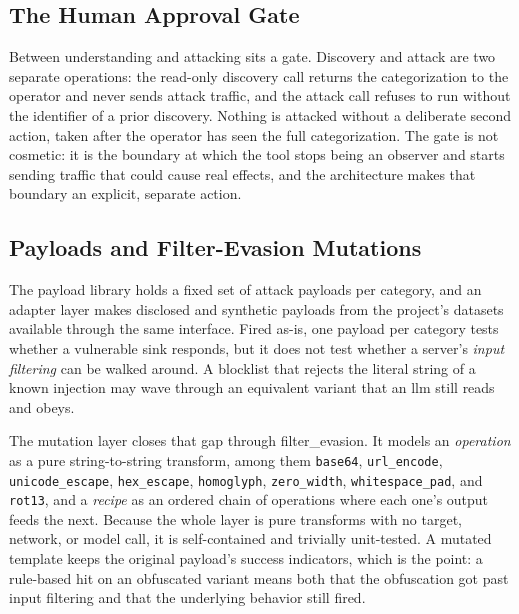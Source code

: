 \subsection{The Human Approval Gate}
\label{sec:gate}

Between understanding and attacking sits a  gate. Discovery and attack are two separate operations: the read-only discovery call returns the categorization to the operator and never sends attack traffic, and the attack call refuses to run without the identifier of a prior discovery. Nothing is attacked without a deliberate second action, taken after the operator has seen the full categorization. The gate is not cosmetic: it is the boundary at which the tool stops being an observer and starts sending traffic that could cause real effects, and the architecture makes that boundary an explicit, separate action.

\subsection{Payloads and Filter-Evasion Mutations}
\label{sec:payloads}

The payload library holds a fixed set of attack \glspl{payload} per category, and an adapter layer makes disclosed and synthetic payloads from the project's datasets available through the same interface. Fired as-is, one payload per category tests whether a vulnerable \gls{sink} responds, but it does not test whether a server's \emph{input filtering} can be walked around. A blocklist that rejects the literal string of a known injection may wave through an equivalent variant that an \gls{llm} still reads and obeys.

The mutation layer closes that gap through \gls{filter_evasion}. It models an \emph{operation} as a pure string-to-string transform, among them \texttt{base64}, \texttt{url\_encode}, \texttt{unicode\_escape}, \texttt{hex\_escape}, \texttt{homoglyph}, \texttt{zero\_width}, \texttt{whitespace\_pad}, and \texttt{rot13}, and a \emph{recipe} as an ordered chain of operations where each one's output feeds the next. Because the whole layer is pure transforms with no target, network, or model call, it is self-contained and trivially unit-tested. A mutated template keeps the original payload's success indicators, which is the point: a rule-based hit on an obfuscated variant means both that the obfuscation got past input filtering and that the underlying behavior still fired.

